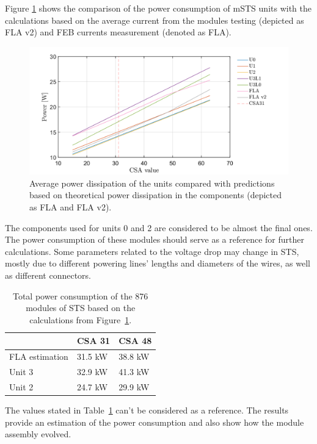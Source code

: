 Figure \ref{fig_theor} shows the comparison of the power consumption of \gls{mSTS} units with the calculations based on the average current from the modules testing (depicted as FLA v2) and FEB currents measurement (denoted as FLA). 

\begin{figure}[h!]
\centering
\includegraphics[width=0.95\columnwidth]{Chapter6/DCS/images/theor.png}
\caption{Average power dissipation of the units compared with predictions based on theoretical power dissipation in the components (depicted as FLA and FLA v2).} 
\label{fig_theor}
\end{figure}
The components used for units 0 and 2 are considered to be almost the final ones. The power consumption of these modules should serve as a reference for further calculations. Some parameters related to the voltage drop may change in \gls{STS}, mostly due to different powering lines' lengths and diameters of the wires, as well as different connectors. 
\begin{table}[h!]
\caption{Total power consumption of the 876 modules of \gls{STS} based on the calculations from Figure~\ref{fig_theor}.}
\centering
\begin{tabular}{lll}
\hline
               & \gls{CSA} 31  & \gls{CSA} 48  \\ \hline
FLA estimation & 31.5 kW & 38.8 kW \\
Unit 3         & 32.9 kW & 41.3 kW \\
Unit 2         & 24.7 kW & 29.9 kW \\ \hline
\end{tabular}

\label{tab:power_cons}
\end{table}
The values stated in Table~\ref{tab:power_cons} can't be considered as a reference. The results provide an estimation of the power consumption and also show how the module assembly evolved. 
